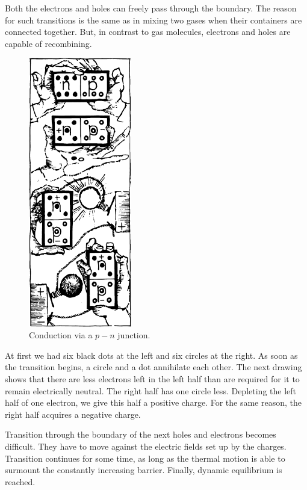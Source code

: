 Both the electrons and holes can freely pass through the boundary. The reason for such transitions is the same as in mixing two gases when their containers are connected together. But, in contrast to gas molecules, electrons and holes are capable of recombining.

\begin{figure}[!ht]
\centering
\includegraphics[width=0.4\textwidth]{figures/fig-02-10.pdf}
\caption{Conduction via a $p\!-\!n$ junction.}
\label{fig-2.10}
\end{figure}

At first we had six black dots at the left and six circles at the right. As soon as the transition begins, a circle and a dot annihilate each other. The next drawing shows that there are less electrons left in the left half than are required for it to remain electrically neutral. The right half has one circle less. Depleting the left half of one electron, we give this half a positive charge. For the same reason, the right half acquires a negative charge.

Transition through the boundary of the next holes and electrons becomes difficult. They have to move against the electric fields set up by the charges. Transition continues for some time, as long as the thermal motion is able to surmount the constantly increasing barrier. Finally, dynamic equilibrium is reached.

